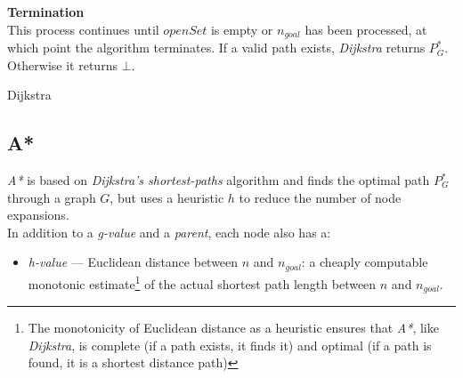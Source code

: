 \documentclass[12pt,notitlepage]{report}
\begin{document}
\noindent
{\bf Termination}\\
\noindent
This process continues until $openSet$ is empty or $n_{goal}$ has been processed, at which point the algorithm terminates. If a valid path exists, {\em Dijkstra} returns $P^{*}_{G}$. Otherwise it returns $\bot$.\

\begin{algorithm}
  \SetAlgoLined\DontPrintSemicolon
  \setcounter{AlgoLine}{0}
  \caption{{\sc Dijkstra}}
\end{algorithm} 

\subsection {A*}

{\em A*} is based on {\em Dijkstra's shortest-paths} algorithm and finds the optimal path\cite{Hart68} $P^{*}_{G}$ through a graph $G$, but uses a heuristic $h$ to reduce the number of node expansions.\\

\noindent
In addition to a {\em g-value} and a {\em parent}, each node also has a:
\begin{itemize}
\item {\em h-value} --- Euclidean distance between {$n$} and {$n_{goal}$}: a cheaply computable monotonic estimate\footnote{The monotonicity of Euclidean distance as a heuristic ensures that {\em A*}, like {\em Dijkstra}, is complete (if a path exists, it finds it) and optimal (if a path is found, it is a shortest distance path)} of the actual shortest path length between $n$ and $n_{goal}$.
\end{itemize}
\end{document}
